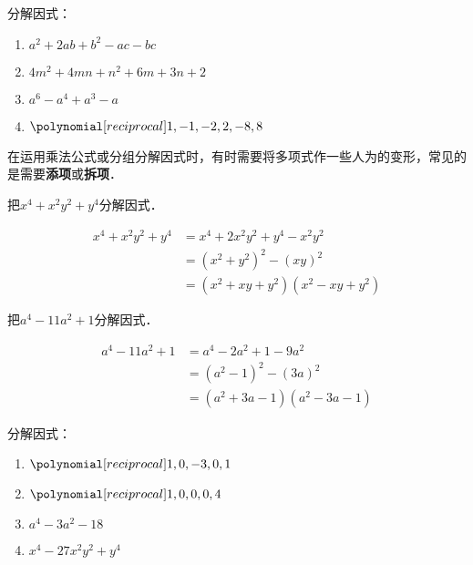 \begin{ex}
 分解因式：
 \begin{enumerate}
     \item $a^2+2ab+b^2-ac-bc$
     \item $4m^2+4mn+n^2+6m+3n+2$
     \item $a^6-a^4+a^3-a$
     \item $\poly{1,-1,-2,2,-8,8}$
 \end{enumerate}   
\end{ex}

在运用乘法公式或分组分解因式时，有时需要将多项式作一些人为的变形，常见的是需要\textbf{添项}或\textbf{拆项}．

\begin{example}
    把$x^4+x^2y^2+y^4$分解因式．
\end{example}

\begin{solution}
\begin{align*}
    x^4+x^2y^2+y^4&=x^4+2x^2y^2+y^4 -x^2y^2 \tag{添项}\\
    &=(x^2+y^2)^2-(xy)^2\\
    &=(x^2+xy+y^2)(x^2-xy+y^2)
\end{align*}   
\end{solution}


\begin{example}
    把$a^4-11a^2+1$分解因式．
\end{example}

\begin{solution}
    \begin{align*}
        a^4-11a^2+1&=a^4-2a^2+1-9a^2 \tag{拆项}\\
        &=(a^2-1)^2-(3a)^2\\
        &=(a^2+3a-1)(a^2-3a-1)
    \end{align*}     
\end{solution}

\begin{ex}
    分解因式：
\begin{multicols}{2}
\begin{enumerate}
\item $\poly{1,0,-3,0,1}$
\item $\poly{1,0,0,0,4}$
\item $a^4-3a^2-18$
\item $x^4-27x^2y^2+y^4$
\end{enumerate}
\end{multicols}
\end{ex}

